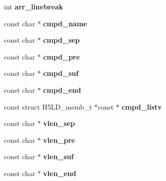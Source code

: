 \begin{DoxyCompactItemize}
\item 
\mbox{\label{structh5tool__format__t_af247805c34b7d8c5e2b2b11773092f74}} 
int {\bfseries arr\+\_\+linebreak}
\item 
\mbox{\label{structh5tool__format__t_aaa41839283e443b41b0b8c4a916e14ee}} 
const char $\ast$ {\bfseries cmpd\+\_\+name}
\item 
\mbox{\label{structh5tool__format__t_ac56f0f4872b9e7b35486e34eb42b49ea}} 
const char $\ast$ {\bfseries cmpd\+\_\+sep}
\item 
\mbox{\label{structh5tool__format__t_a406dbed75a961b6b408f068bc0cab291}} 
const char $\ast$ {\bfseries cmpd\+\_\+pre}
\item 
\mbox{\label{structh5tool__format__t_aca65074425fdfd11c0ce8631e103a6bf}} 
const char $\ast$ {\bfseries cmpd\+\_\+suf}
\item 
\mbox{\label{structh5tool__format__t_a053bff368d1d01c1b1d6a762e0f69a37}} 
const char $\ast$ {\bfseries cmpd\+\_\+end}
\item 
\mbox{\label{structh5tool__format__t_a344d3c8d92c964e84ab4dddac0b917ea}} 
const struct H5\+L\+D\+\_\+memb\+\_\+t $\ast$const  $\ast$ {\bfseries cmpd\+\_\+listv}
\item 
\mbox{\label{structh5tool__format__t_a63b2d42704f40d197c1ea76176863cb2}} 
const char $\ast$ {\bfseries vlen\+\_\+sep}
\item 
\mbox{\label{structh5tool__format__t_a044f42fa3722856432416d9079222ef1}} 
const char $\ast$ {\bfseries vlen\+\_\+pre}
\item 
\mbox{\label{structh5tool__format__t_adfeca2fc20e31959fa4598b5d489a2ab}} 
const char $\ast$ {\bfseries vlen\+\_\+suf}
\item 
\mbox{\label{structh5tool__format__t_ad05ceacb04499283e720de9246626f74}} 
const char $\ast$ {\bfseries vlen\+\_\+end}

\end{DoxyCompactItemize}
